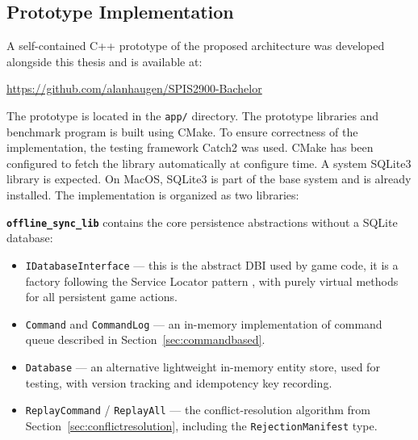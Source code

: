 \documentclass{article}
\begin{document}
\subsection{Prototype Implementation}

A self-contained C++ prototype of the proposed architecture was developed alongside this thesis and is available at:

\begin{center}
\url{https://github.com/alanhaugen/SPIS2900-Bachelor}
\end{center}

The prototype is located in the \texttt{app/} directory. The prototype libraries and benchmark program is built using CMake. To ensure correctness of the implementation, the testing framework Catch2 was used. CMake has been configured to fetch the library automatically at configure time. A system SQLite3 library is expected. On MacOS, SQLite3 is part of the base system and is already installed. The implementation is organized as two libraries:

\textbf{\texttt{offline\_sync\_lib}} contains the core persistence abstractions without a SQLite database:
\begin{itemize}
  \item \texttt{IDatabaseInterface} — this is the abstract DBI used by game code, it is a factory following the Service Locator pattern \autocite{nystrom2014servicelocator}, with purely virtual methods for all persistent game actions.
  \item \texttt{Command} and \texttt{CommandLog} — an in-memory implementation of command queue described in Section~\ref{sec:commandbased}.
  \item \texttt{Database} — an alternative lightweight in-memory entity store, used for testing, with version tracking and idempotency key recording.
  \item \texttt{ReplayCommand} / \texttt{ReplayAll} — the conflict-resolution algorithm from Section~\ref{sec:conflictresolution}, including the \texttt{RejectionManifest} type.
\end{itemize}
\end{document}

